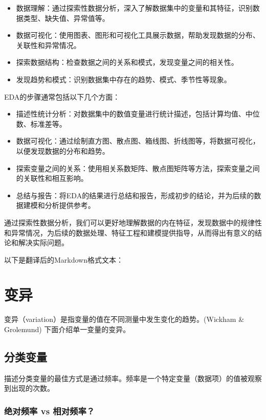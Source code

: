 \documentclass[]{book}
\begin{document}
\begin{itemize}
\item
  数据理解：通过探索性数据分析，深入了解数据集中的变量和其特征，识别数据类型、缺失值、异常值等。
\item
  数据可视化：使用图表、图形和可视化工具展示数据，帮助发现数据的分布、关联性和异常情况。
\item
  探索数据结构：检查数据之间的关系和模式，发现变量之间的相关性。
\item
  发现趋势和模式：识别数据集中存在的趋势、模式、季节性等现象。
\end{itemize}

EDA的步骤通常包括以下几个方面：

\begin{itemize}
\item
  描述性统计分析：对数据集中的数值变量进行统计描述，包括计算均值、中位数、标准差等。
\item
  数据可视化：通过绘制直方图、散点图、箱线图、折线图等，将数据可视化，以便发现数据的分布和趋势。
\item
  探索变量之间的关系：使用相关系数矩阵、散点图矩阵等方法，探索变量之间的关联性和相互影响。
\item
  总结与报告：将EDA的结果进行总结和报告，形成初步的结论，并为后续的数据建模和分析提供参考。
\end{itemize}

通过探索性数据分析，我们可以更好地理解数据的内在特征，发现数据中的规律性和异常情况，为后续的数据处理、特征工程和建模提供指导，从而得出有意义的结论和解决实际问题。

以下是翻译后的Markdown格式文本：

\hypertarget{ux53d8ux5f02}{%
\section{变异}\label{ux53d8ux5f02}}

变异（variation）是指变量的值在不同测量中发生变化的趋势。(Wickham \& Grolemund)
下面介绍单一变量的变异。

\hypertarget{ux5206ux7c7bux53d8ux91cf}{%
\subsection{分类变量}\label{ux5206ux7c7bux53d8ux91cf}}

描述分类变量的最佳方式是通过频率。频率是一个特定变量（数据项）的值被观察到出现的次数。

\hypertarget{ux7eddux5bf9ux9891ux7387-vs-ux76f8ux5bf9ux9891ux7387}{%
\subsubsection{绝对频率 vs 相对频率？}\label{ux7eddux5bf9ux9891ux7387-vs-ux76f8ux5bf9ux9891ux7387}}
\end{document}
